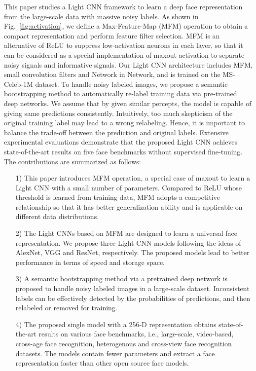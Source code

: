 \documentclass[journal,transmag]{IEEEtran}
\begin{document}
This paper studies a Light CNN framework to learn a deep face representation from the large-scale data with massive noisy labels. As shown in Fig.~\ref{fig:activation}, we define a Max-Feature-Map (MFM) operation to obtain a compact representation and perform feature filter selection. MFM is an alternative of ReLU to suppress low-activation neurons in each layer, so that it can be considered as a special implementation of maxout activation \cite{goodfellow2013maxout} to separate noisy signals and informative signals. Our Light CNN architecture includes MFM, small convolution filters and Network in Network, and is trained on the MS-Celeb-1M dataset. To handle noisy labeled images, we propose a semantic bootstrapping method to automatically re-label training data via pre-trained deep networks. We assume that by given similar percepts, the model is capable of giving same predictions consistently.
Intuitively, too much skepticism of the original training label may lead to a wrong relabeling. Hence, it is important to balance the trade-off between the prediction and original labels. Extensive experimental evaluations demonstrate that the proposed Light CNN achieves state-of-the-art results on five face benchmarks without supervised fine-tuning. The contributions are summarized as follows:
\begin{itemize}\setlength{\itemsep}{1pt}
\item[1)] This paper introduces MFM operation, a special case of maxout to learn a Light CNN with a small number of parameters. Compared to ReLU whose threshold is learned from training data, MFM adopts a competitive relationship so that it has better generalization ability and is applicable on different data distributions.
\item[2)] The Light CNNs based on MFM are designed to learn a universal face representation. We propose three Light CNN models following the ideas of AlexNet, VGG and ResNet, respectively. The proposed models lead to better performance in terms of speed and storage space.
\item[3)] A semantic bootstrapping method via a pretrained deep network is proposed to handle noisy labeled images in a large-scale dataset. Inconsistent labels can be effectively detected by the probabilities of predictions, and then relabeled or removed for training.
\item[4)] The proposed single model with a 256-D representation obtains state-of-the-art results on various face benchmarks, i.e., large-scale, video-based, cross-age face recognition, heterogenous and cross-view face recognition datasets. The models contain fewer parameters and extract a face representation faster than other open source face models.%
\end{itemize}
\end{document}
